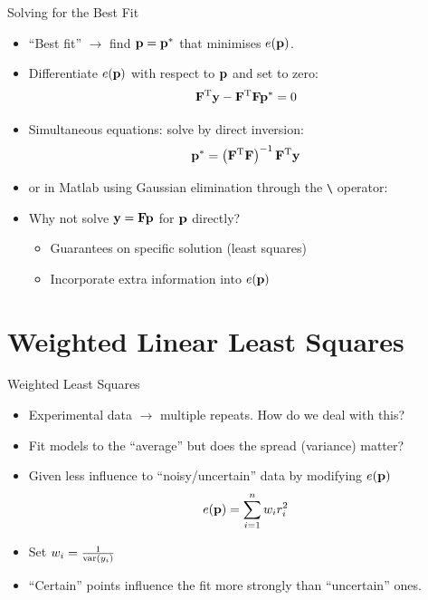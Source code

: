 \documentclass{beamer}
\begin{document}
\begin{frame}{Solving for the Best Fit}
  \begin{itemize}
    \item ``Best fit'' $\rightarrow$ find $\mathbf{p}=\mathbf{p}^*$ that minimises $e(\mathbf{p})$.
    \item Differentiate $e(\mathbf{p})$ with respect to $\mathbf{p}$ and set to zero:
      \begin{equation*}
        \mathbf{F}^{\mathrm{T}}\mathbf{y}-\mathbf{F}^{\mathrm{T}}\mathbf{F}\mathbf{p}^*=0
      \end{equation*}
    \item Simultaneous equations: solve by direct inversion:
      \begin{equation*}
        \mathbf{p}^* = \left(\mathbf{F}^{\mathrm{T}}\mathbf{F}\right)^{-1}\mathbf{F}^{\mathrm{T}}\mathbf{y}
      \end{equation*}
    \item or in Matlab using Gaussian elimination through the \texttt{\textbackslash} operator:
    \item Why not solve $\mathbf{y}=\mathbf{F}\mathbf{p}$ for $\mathbf{p}$ directly?
      \begin{itemize}
      \item Guarantees on specific solution (least squares)
      \item Incorporate extra information into $e(\mathbf{p})$
      \end{itemize}
  \end{itemize}
\end{frame}

\section{Weighted Linear Least Squares}

\begin{frame}{Weighted Least Squares}
  \begin{itemize}
    \item Experimental data $\rightarrow$ multiple repeats. How do we deal with this?
    \item Fit models to the ``average''  but does the spread (variance) matter?
    \item Given less influence to ``noisy/uncertain'' data by modifying $e(\mathbf{p})$
      \begin{equation*}
        e(\mathbf{p}) = \sum_{i=1}^n w_ir_i^2
      \end{equation*}
    \item Set $w_i = \frac{1}{\operatorname*{var}(y_i)}$
    \item ``Certain'' points influence the fit more strongly than ``uncertain'' ones.
  \end{itemize}
\end{frame}
\end{document}
